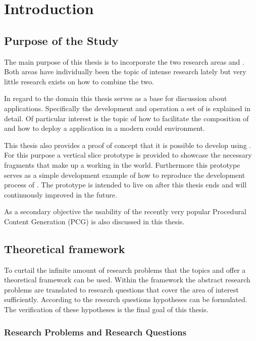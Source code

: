 \chapter{Introduction}

\section{Purpose of the Study}

The main purpose of this thesis is to incorporate the two research areas \mss{}
and \ogs{}. Both areas have individually been the topic of intense research
lately  but very little research exists on how to combine
the two.

In regard to the \mss{} domain this thesis serves as a base for discussion about
\ms{} applications. Specifically the development and operation a set of \mss{} is
explained in detail. Of particular interest is the topic of how to facilitate
the composition of \mss{} and how to deploy a \ms{} application in a modern could
environment.

This thesis also provides a proof of concept that it is possible to develop
\ogs{} using \mss{}. For this purpose a vertical slice prototype is provided to
showcase the necessary fragments that make up a working \og{} in the \ms{}
world. Furthermore this prototype serves as a simple development example of how
to reproduce the development process of \ogs{}. The prototype is intended to
live on after this thesis ends and will continuously improved in the future.

As a secondary objective the usability of the recently very popular
 Procedural Content Generation (PCG) is also discussed in
this thesis.

\section{Theoretical framework}

To curtail the infinite amount of research problems that the topics \ogs{} and
\mss{} offer a theoretical framework can be used. Within the framework the
abstract research problems are translated to research questions that cover the
area of interest sufficiently. According to the research questions hypotheses
can be formulated. The verification of these hypotheses is the final goal of
this thesis.

\subsection{Research Problems and Research Questions}

